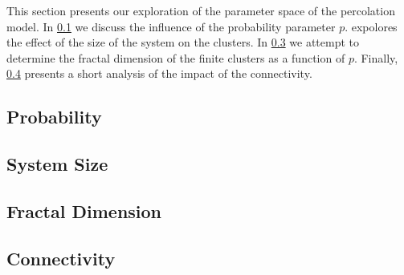 This section presents our exploration of the parameter space of the percolation model. In \cref{ss:exp:probability} we discuss the influence of the probability parameter $p$.  expolores the effect of the size of the system on the clusters. In \cref{ss:exp:fractal} we attempt to determine the fractal dimension of the finite clusters as a function of $p$. Finally, \cref{ss:exp:connectivity} presents a short analysis of the impact of the connectivity.


\subsection{Probability}
\label{ss:exp:probability}


\subsection{System Size}
\label{ss:exp:systemSize}


\subsection{Fractal Dimension}
\label{ss:exp:fractal}
	

\subsection{Connectivity}
\label{ss:exp:connectivity}

